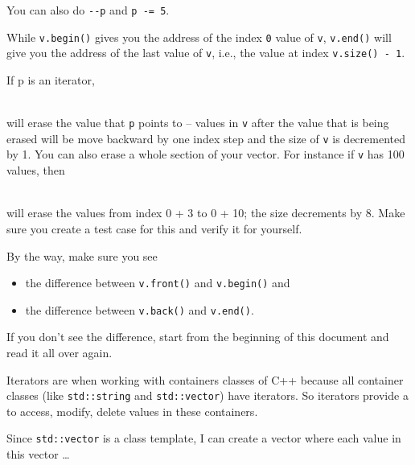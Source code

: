 You can also do \verb!--p! and \verb!p -= 5!.

While \verb!v.begin()! gives you the address of the index \verb!0! value of \verb!v!, \verb!v.end()! will give you the address of the last value of \verb!v!, i.e., the value at index \verb!v.size() - 1!.

If p is an iterator,

\\

will erase the value that \texttt{p} points to -- values in \texttt{v} after
the value that is being erased will be move backward by one index step
and the size of \texttt{v} is decremented by 1. You can also erase a whole
section of your vector. For instance if \texttt{v} has 100 values, then

\\

will erase the values from index 0 + 3 to 0 + 10; the size decrements by
8. Make sure you create a test case for this and verify it for yourself.

By the way, make sure you see

\begin{itemize}
\item
  the difference between \texttt{v.front()} and \texttt{v.begin()} and
\item
  the difference between \texttt{v.back()} and \texttt{v.end()}.
\end{itemize}

If you don't see the difference, start from the beginning of this
document and read it all over again.

Iterators are  when working with containers classes of C++ because all container classes (like \verb!std::string! and \verb!std::vector!) have iterators. So iterators provide a  to access, modify, delete values in these containers.

\newpage{}

Since \texttt{std::vector} is a class template, I can create a vector where each value in this vector \ldots {}

\\
\\


